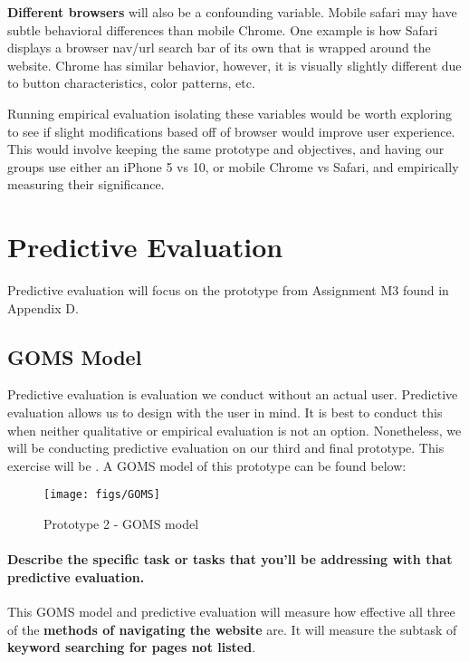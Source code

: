 \textbf{Different browsers} will also be a confounding variable. Mobile safari may have subtle behavioral differences than mobile Chrome. One example is how Safari displays a browser nav/url search bar of its own that is wrapped around the website. Chrome has similar behavior, however, it is visually slightly different due to button characteristics, color patterns, etc.

Running empirical evaluation isolating these variables would be worth exploring to see if slight modifications based off of browser would improve user experience. This would involve keeping the same prototype and objectives, and having our groups use either an iPhone 5 vs 10, or mobile Chrome vs Safari, and empirically measuring their significance.

\section{Predictive Evaluation}
Predictive evaluation will focus on the prototype from Assignment M3 found in Appendix D.

\subsection{GOMS Model}
Predictive evaluation is evaluation we conduct without an actual user. Predictive evaluation allows us to design with the user in mind. It is best to conduct this when neither qualitative or empirical evaluation is not an option. Nonetheless, we will be conducting predictive evaluation on our third and final prototype. This exercise will be . A GOMS model of this prototype can be found below:

\begin{figure}[H]
  \centering
  \texttt{[image: figs/GOMS]}
  \caption{Prototype 2 - GOMS model}
  \label{fig::1}
\end{figure}

\paragraph{Describe the specific task or tasks that you’ll be addressing with that predictive evaluation.} This GOMS model and predictive evaluation will measure how effective all three of the \textbf{methods of navigating the website} are. It will measure the subtask of \textbf{keyword searching for pages not listed}.

